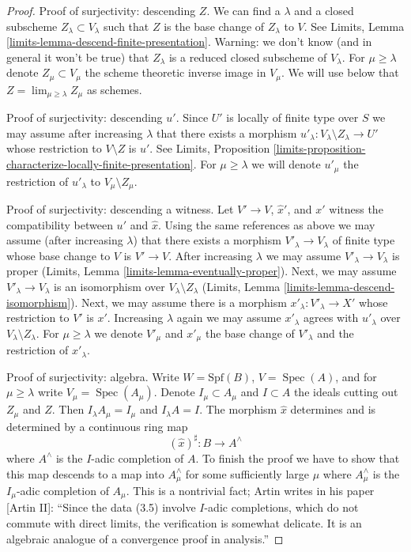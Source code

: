 \documentclass[10pt,a4paper]{amsart}
\theoremstyle{plain}
\theoremstyle{definition}
\theoremstyle{remark}
\numberwithin{equation}{subsection}
\def\lim{\mathop{\mathrm{lim}}\nolimits}
\def\Spec{\mathop{\mathrm{Spec}}}
\begin{document}
\begin{proof}
\medskip\noindent
Proof of surjectivity: descending $Z$. We can find a $\lambda$
and a closed subscheme $Z_\lambda \subset V_\lambda$ such that
$Z$ is the base change of $Z_\lambda$ to $V$. See
Limits, Lemma \ref{limits-lemma-descend-finite-presentation}.
Warning: we don't know (and in general it won't be true)
that $Z_\lambda$ is a reduced closed subscheme of $V_\lambda$.
For $\mu \geq \lambda$ denote $Z_\mu \subset V_\mu$ the scheme theoretic
inverse image in $V_\mu$. We will use below that
$Z = \lim_{\mu \geq \lambda} Z_\mu$ as schemes.

\medskip\noindent
Proof of surjectivity: descending $u'$.
Since $U'$ is locally of finite type over $S$
we may assume after increasing $\lambda$
that there exists a morphism
$u'_\lambda : V_\lambda \setminus Z_\lambda \to U'$
whose restriction to $V \setminus Z$ is $u'$.
See Limits, Proposition
\ref{limits-proposition-characterize-locally-finite-presentation}.
For $\mu \geq \lambda$ we will denote $u'_\mu$ the restriction
of $u'_\lambda$ to $V_\mu \setminus Z_\mu$.

\medskip\noindent
Proof of surjectivity: descending a witness.
Let $V' \to V$, $\hat x'$, and $x'$ witness the compatibility between
$u'$ and $\hat x$. Using the same references as above we may assume
(after increasing $\lambda$) that there exists a morphism
$V'_\lambda \to V_\lambda$ of finite type whose base change to $V$
is $V' \to V$. After increasing $\lambda$ we may assume
$V'_\lambda \to V_\lambda$ is proper
(Limits, Lemma \ref{limits-lemma-eventually-proper}).
Next, we may assume $V'_\lambda \to V_\lambda$ is an isomorphism
over $V_\lambda \setminus Z_\lambda$
(Limits, Lemma \ref{limits-lemma-descend-isomorphism}).
Next, we may assume there is a morphism $x'_\lambda : V'_\lambda \to X'$
whose restriction to $V'$ is $x'$.
Increasing $\lambda$ again we may assume $x'_\lambda$
agrees with $u'_\lambda$ over $V_\lambda \setminus Z_\lambda$.
For $\mu \geq \lambda$ we denote
$V'_\mu$ and $x'_\mu$ the base change of $V'_\lambda$ and the
restriction of $x'_\lambda$.

\medskip\noindent
Proof of surjectivity: algebra.
Write $W = \text{Spf}(B)$, $V = \Spec(A)$, and
for $\mu \geq \lambda$ write $V_\mu = \Spec(A_\mu)$.
Denote $I_\mu \subset A_\mu$ and $I \subset A$
the ideals cutting out $Z_\mu$ and $Z$.
Then $I_\lambda A_\mu = I_\mu$ and $I_\lambda A = I$.
The morphism $\hat x$ determines and is determined by a
continuous ring map
$$
(\hat x)^\sharp : B \longrightarrow A^\wedge
$$
where $A^\wedge$ is the $I$-adic completion of $A$.
To finish the proof we have to show that this map descends to a map into
$A_\mu^\wedge$ for some sufficiently large $\mu$ where $A_\mu^\wedge$
is the $I_\mu$-adic completion of $A_\mu$.
This is a nontrivial fact; Artin writes in his paper
[Artin II]: ``Since the data (3.5) involve $I$-adic completions,
which do not commute with direct limits, the verification is somewhat
delicate. It is an algebraic analogue of a convergence proof in analysis.''


\end{proof}
\end{document}
